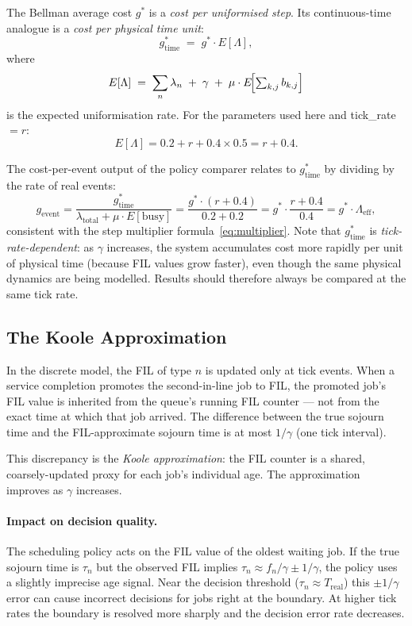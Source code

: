 \documentclass[11pt,a4paper]{article}
\begin{document}
The Bellman average cost $g^*$ is a \emph{cost per uniformised step}.  Its
continuous-time analogue is a \emph{cost per physical time unit}:
\begin{equation}
  g^*_\text{time}
    \;=\; g^* \cdot E[\Lambda],
  \label{eq:g_time}
\end{equation}
where
\begin{equation}
  E[\Lambda]
    \;=\; \sum_n \lambda_n \;+\; \gamma \;+\; \mu \cdot E\!\Bigl[\textstyle\sum_{k,j} b_{k,j}\Bigr]
  \label{eq:elambda}
\end{equation}
is the expected uniformisation rate.  For the parameters used here and
tick\_rate $= r$:
\[
  E[\Lambda]
    = 0.2 + r + 0.4 \times 0.5
    = r + 0.4.
\]

The cost-per-event output of the policy comparer relates to $g^*_\text{time}$
by dividing by the rate of real events:
\begin{equation}
  g_\text{event}
    = \frac{g^*_\text{time}}{\lambda_\text{total} + \mu \cdot E[\text{busy}]}
    = \frac{g^* \cdot (r + 0.4)}{0.2 + 0.2}
    = g^* \cdot \frac{r + 0.4}{0.4}
    = g^* \cdot \Lambda_\text{eff},
  \label{eq:g_event_cont}
\end{equation}
consistent with the step multiplier formula~\eqref{eq:multiplier}.  Note that
$g^*_\text{time}$ is \emph{tick-rate-dependent}: as $\gamma$ increases, the
system accumulates cost more rapidly per unit of physical time (because FIL
values grow faster), even though the same physical dynamics are being modelled.
Results should therefore always be compared at the same tick rate.

\subsection{The Koole Approximation}

In the discrete model, the FIL of type $n$ is updated only at tick events.
When a service completion promotes the second-in-line job to FIL, the promoted
job's FIL value is inherited from the queue's running FIL counter --- not from
the exact time at which that job arrived.  The difference between the true
sojourn time and the FIL-approximate sojourn time is at most $1/\gamma$
(one tick interval).

This discrepancy is the \emph{Koole approximation}: the FIL counter is a
shared, coarsely-updated proxy for each job's individual age.  The approximation
improves as $\gamma$ increases.

\paragraph{Impact on decision quality.}
The scheduling policy acts on the FIL value of the oldest waiting job.  If the
true sojourn time is $\tau_n$ but the observed FIL implies $\tau_n \approx f_n
/ \gamma \pm 1/\gamma$, the policy uses a slightly imprecise age signal.  Near
the decision threshold ($\tau_n \approx T_\text{real}$) this $\pm 1/\gamma$
error can cause incorrect decisions for jobs right at the boundary.  At higher
tick rates the boundary is resolved more sharply and the decision error rate
decreases.
\end{document}

